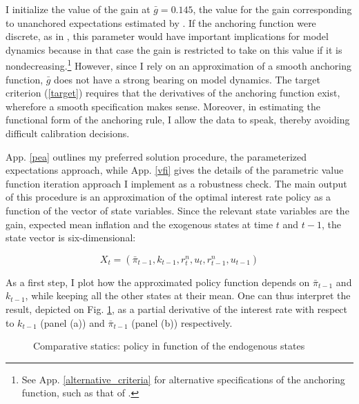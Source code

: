 \documentclass[11pt]{article}
\def \myFigPath {../../figures/}
\renewcommand{\[}{\begin{equation}}
\renewcommand{\]}{\end{equation}}
\def\fignameDiDk{analyze_opt_policy_ik}
\def\fignameDiDpibar{analyze_opt_policy_ip}
\begin{document}
\vspace{-1.0cm}

I initialize the value of the gain at $\bar{g}=0.145$, the value for the gain corresponding to unanchored expectations estimated by \cite{carvalho2019anchored}. If the anchoring function were discrete, as in \cite{carvalho2019anchored}, this parameter would have important implications for model dynamics because in that case the gain is restricted to take on this value if it is nondecreasing.\footnote{See App. \ref{alternative_criteria} for alternative specifications of the anchoring function, such as that of \cite{carvalho2019anchored}.} However, since I rely on an approximation of a smooth anchoring function, $\bar{g}$ does not have a strong bearing on model dynamics. The target criterion (\ref{target}) requires that the derivatives of the anchoring function exist, wherefore a smooth specification makes sense. Moreover, in estimating the functional form of the anchoring rule, I allow the data to speak, thereby avoiding difficult calibration decisions.

App. \ref{pea} outlines my preferred solution procedure, the parameterized expectations approach, while App. \ref{vfi} gives the details of the parametric value function iteration approach I implement as a robustness check. The main output of this procedure is an approximation of the optimal interest rate policy as a function of the vector of state variables. Since the relevant state variables are the gain, expected mean inflation and the exogenous states at time $t$ and $t-1$, the state vector is six-dimensional:

\begin{equation}
X_t = (\bar{\pi}_{t-1}, k_{t-1}, r^n_t, u_t, r^n_{t-1}, u_{t-1})
\end{equation}

As a first step, I plot how the approximated policy function depends on $\bar{\pi}_{t-1}$ and $k_{t-1}$, while keeping all the other states at their mean. One can thus interpret the result, depicted on Fig. \ref{di}, as a partial derivative of the interest rate with respect to $k_{t-1}$ (panel (a)) and $\bar{\pi}_{t-1}$ (panel (b)) respectively.

\begin{figure}[h!]
\caption{Comparative statics: policy in function of the endogenous states}
\label{di}
\end{figure}
\end{document}
